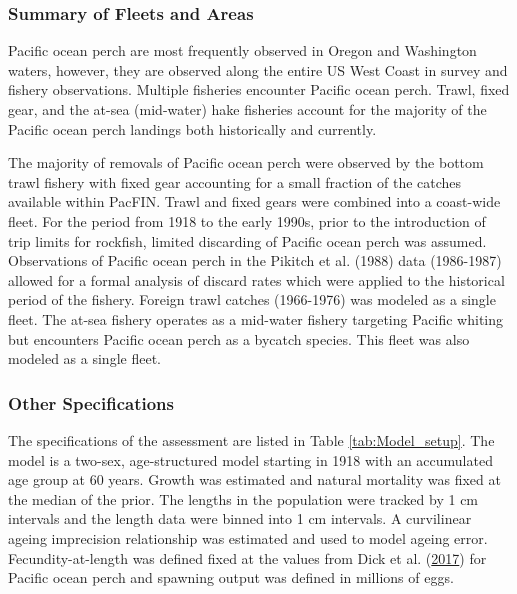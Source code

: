 \documentclass[12pt,]{article}
\begin{document}
\subsubsection{Summary of Fleets and
Areas}\label{summary-of-fleets-and-areas}

Pacific ocean perch are most frequently observed in Oregon and
Washington waters, however, they are observed along the entire US West
Coast in survey and fishery observations. Multiple fisheries encounter
Pacific ocean perch. Trawl, fixed gear, and the at-sea (mid-water) hake
fisheries account for the majority of the Pacific ocean perch landings
both historically and currently.

The majority of removals of Pacific ocean perch were observed by the
bottom trawl fishery with fixed gear accounting for a small fraction of
the catches available within PacFIN. Trawl and fixed gears were combined
into a coast-wide fleet. For the period from 1918 to the early 1990s,
prior to the introduction of trip limits for rockfish, limited
discarding of Pacific ocean perch was assumed. Observations of Pacific
ocean perch in the Pikitch et al. (1988) data (1986-1987) allowed for a
formal analysis of discard rates which were applied to the historical
period of the fishery. Foreign trawl catches (1966-1976) was modeled as
a single fleet. The at-sea fishery operates as a mid-water fishery
targeting Pacific whiting but encounters Pacific ocean perch as a
bycatch species. This fleet was also modeled as a single fleet.

\subsubsection{Other Specifications}\label{other-specifications}

The specifications of the assessment are listed in Table
\ref{tab:Model_setup}. The model is a two-sex, age-structured model
starting in 1918 with an accumulated age group at 60 years. Growth was
estimated and natural mortality was fixed at the median of the prior.
The lengths in the population were tracked by 1 cm intervals and the
length data were binned into 1 cm intervals. A curvilinear ageing
imprecision relationship was estimated and used to model ageing error.
Fecundity-at-length was defined fixed at the values from Dick et al.
(\protect\hyperlink{ref-dick_meta-analysis_2017}{2017}) for Pacific
ocean perch and spawning output was defined in millions of eggs.
\end{document}
